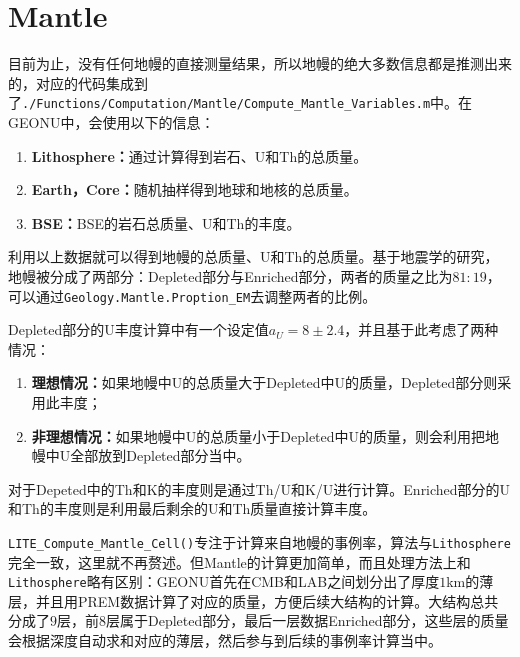 		\section{Mantle}
			目前为止，没有任何地幔的直接测量结果，所以地幔的绝大多数信息都是推测出来的，对应的代码集成到了\texttt{./Functions/Computation/Mantle/Compute\_Mantle\_Variables.m}中。在GEONU中，会使用以下的信息：
				\begin{enumerate}
					\item \textbf{Lithosphere：}通过计算得到岩石、U和Th的总质量。
					\item \textbf{Earth，Core：}随机抽样得到地球和地核的总质量。
					\item \textbf{BSE：}BSE的岩石总质量、U和Th的丰度。
				\end{enumerate}
			利用以上数据就可以得到地幔的总质量、U和Th的总质量。基于地震学的研究，地幔被分成了两部分：Depleted部分与Enriched部分，两者的质量之比为$81:19$，可以通过\texttt{Geology.Mantle.Proption\_EM}去调整两者的比例。\par
			Depleted部分的U丰度计算中有一个设定值$a_U = 8\pm 2.4$，并且基于此考虑了两种情况：
				\begin{enumerate}
					\item \textbf{理想情况：}如果地幔中U的总质量大于Depleted中U的质量，Depleted部分则采用此丰度；
					\item \textbf{非理想情况：}如果地幔中U的总质量小于Depleted中U的质量，则会利用把地幔中U全部放到Depleted部分当中。
				\end{enumerate}
			对于Depeted中的Th和K的丰度则是通过Th/U和K/U进行计算。Enriched部分的U和Th的丰度则是利用最后剩余的U和Th质量直接计算丰度。\par
			\texttt{LITE\_Compute\_Mantle\_Cell()}专注于计算来自地幔的事例率，算法与\texttt{Lithosphere}完全一致，这里就不再赘述。但Mantle的计算更加简单，而且处理方法上和\texttt{Lithosphere}略有区别：GEONU首先在CMB和LAB之间划分出了厚度$1$km的薄层，并且用PREM数据计算了对应的质量，方便后续大结构的计算。大结构总共分成了$9$层，前$8$层属于Depleted部分，最后一层数据Enriched部分，这些层的质量会根据深度自动求和对应的薄层，然后参与到后续的事例率计算当中。
				
